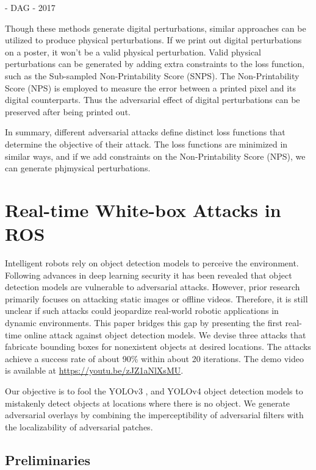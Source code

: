 - DAG \citep{xie2017adversarial} - 2017

Though these methods generate digital perturbations, similar approaches can be utilized to produce physical perturbations. If we print out digital perturbations on a poster, it won't be a valid physical perturbation. Valid physical perturbations can be generated by adding extra constraints to the loss function, such as the Sub-sampled Non-Printability Score (SNPS). The Non-Printability Score (NPS) is employed to measure the error between a printed pixel and its digital counterparts. Thus the adversarial effect of digital perturbations can be preserved after being printed out.

In summary, different adversarial attacks define distinct loss functions that determine the objective of their attack. The loss functions are minimized in similar ways, and if we add constraints on the Non-Printability Score (NPS), we can generate phjmysical perturbations.


\section{Real-time White-box Attacks in ROS}
\label{sec:adv_detect}

Intelligent robots rely on object detection models to perceive the environment. Following advances in deep learning security it has been revealed that object detection models are vulnerable to adversarial attacks. However, prior research primarily focuses on attacking static images or offline videos. Therefore, it is still unclear if such attacks could jeopardize real-world robotic applications in dynamic environments. 
This paper bridges this gap by presenting the first real-time online attack against object detection models. We devise three attacks that fabricate bounding boxes for nonexistent objects at desired locations. The attacks achieve a success rate of about 90\% within about 20 iterations. The demo video is available at \href{https://youtu.be/zJZ1aNlXsMU}{https://youtu.be/zJZ1aNlXsMU}.

Our objective is to fool the YOLOv3 \citep{redmon2018yolov3}, and YOLOv4 \citep{bochkovskiy2020yolov4} object detection models to mistakenly detect objects at locations where there is no object. We generate adversarial overlays by combining the imperceptibility of adversarial filters with the localizability of adversarial patches.

\subsection{Preliminaries}
\label{section_preliminaries}

